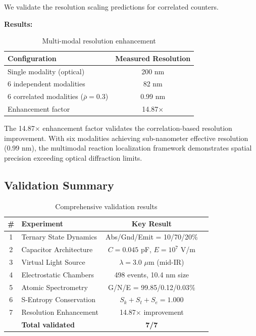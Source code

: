 \documentclass[twocolumn,10pt]{article}
\begin{document}
We validate the resolution scaling predictions for correlated counters.

\textbf{Results:}
\begin{table}[H]
\centering
\caption{Multi-modal resolution enhancement}
\begin{tabular}{@{}lc@{}}
\toprule
Configuration & Measured Resolution \\
\midrule
Single modality (optical) & 200 nm \\
6 independent modalities & 82 nm \\
6 correlated modalities ($\bar{\rho} = 0.3$) & 0.99 nm \\
Enhancement factor & 14.87$\times$ \\
\bottomrule
\end{tabular}
\end{table}

The 14.87$\times$ enhancement factor validates the correlation-based resolution improvement. With six modalities achieving sub-nanometer effective resolution (0.99 nm), the multimodal reaction localization framework demonstrates spatial precision exceeding optical diffraction limits.

\subsection{Validation Summary}

\begin{table}[H]
\centering
\caption{Comprehensive validation results}
\begin{tabular}{@{}clcc@{}}
\toprule
\# & Experiment & Key Result \\
\midrule
1 & Ternary State Dynamics & Abs/Gnd/Emit = 10/70/20\% \\
2 & Capacitor Architecture & $C = 0.045$ pF, $E = 10^7$ V/m  \\
3 & Virtual Light Source & $\lambda = 3.0$ $\mu$m (mid-IR)  \\
4 & Electrostatic Chambers & 498 events, 10.4 nm size  \\
5 & Atomic Spectrometry & G/N/E = 99.85/0.12/0.03\%  \\
6 & S-Entropy Conservation & $S_k + S_t + S_e = 1.000$ \\
7 & Resolution Enhancement & 14.87$\times$ improvement \\
\midrule
& \textbf{Total validated} & \textbf{7/7} & \\
\bottomrule
\end{tabular}
\end{table}
\end{document}

